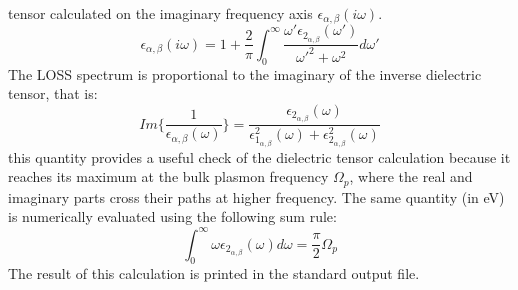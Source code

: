 \documentclass[twocolumn]{article}
\begin{document}
tensor calculated on the imaginary frequency axis $\epsilon_{\alpha,\beta}(i\omega)$. 
\begin{equation}
\epsilon_{\alpha,\beta}(i\omega)=1+\frac{2}{\pi}\int_{0}^{\infty}\frac{\omega' \epsilon_{2_{\alpha,\beta}}(\omega')}
{\omega'^{2}+\omega^{2}}d\omega'
\end{equation}
The LOSS spectrum is proportional to the imaginary of the inverse dielectric tensor, that is:
\begin{equation}
Im\Bigg\{\frac{1}{\epsilon_{\alpha,\beta}(\omega)}\Bigg\}=
\frac{\epsilon_{2_{\alpha,\beta}}(\omega)}{\epsilon_{1_{\alpha,\beta}}^{2}(\omega)+
\epsilon_{2_{\alpha,\beta}}^{2}(\omega)}
\end{equation}
this quantity provides a useful check of the dielectric tensor calculation because it reaches its maximum at the bulk plasmon
frequency $\Omega_{p}$, where the real and imaginary parts cross their paths at higher frequency. The same quantity (in eV)
is numerically evaluated using the following sum rule:
\begin{equation}
\int_{0}^{\infty}\omega\epsilon_{2_{\alpha,\beta}}(\omega)d\omega=\frac{\pi}{2}\Omega_{p}
\end{equation}  
The result of this calculation is printed in the standard output file.
\end{document}
